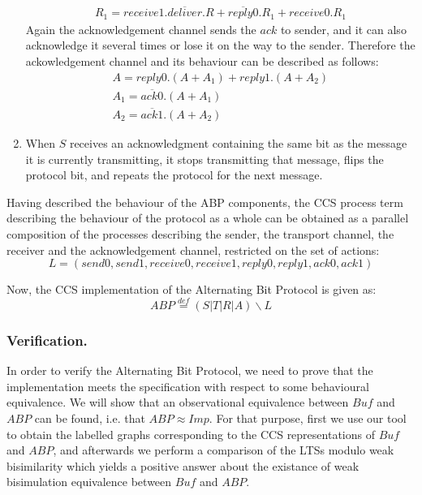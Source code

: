 \begin{enumerate}
\begin{equation*}
\begin{array}{lcl}
							R_{1}=receive1.\overline{deliver}.R+\overline{reply0}.R_{1}+receive0.R_{1}			  
						\end{array}
				\end{equation*}
        Again the acknowledgement channel sends the $ack$ to sender, and it can also acknowledge it several times or lose it on the way to the sender. Therefore the ackowledgement channel and its behaviour can be described as follows:
        \begin{equation*}\label{trans_imp}
	      	\begin{array}{lcl}
						A=reply0.\left(A+A_{1}\right)+reply1.\left(A+A_{2}\right)\\
						A_{1}=\overline{ack0}.\left(A+A_{1}\right)\\
						A_{2}=\overline{ack1}.\left(A+A_{2}\right)
					\end{array}
				\end{equation*}
  \item When $S$ receives an acknowledgment containing the same bit as the message it is currently transmitting, it stops transmitting that message, flips the protocol bit, and repeats the protocol for the next message.\cite{Kulick}\cite{ProcessAlgebraParallel}
\end{enumerate}

Having described the behaviour of the ABP components, the CCS process term describing the behaviour of the protocol as a whole can be obtained as a parallel composition of the processes describing the sender, the transport channel, the receiver and the acknowledgement channel, restricted on the set of actions:
\begin{equation*}
  L = \left(send0,send1,receive0,receive1,reply0,reply1,ack0,ack1\right)
\end{equation*}

Now, the CCS implementation of the Alternating Bit Protocol is given as:
\begin{equation}\label{abp_imp}
	ABP \stackrel{def}{=}\left(S|T|R|A\right)\backslash L
\end{equation}

\subsubsection{Verification.} In order to verify the Alternating Bit Protocol, we need to prove that the implementation meets the specification with respect to some behavioural equivalence. We will show that an observational equivalence between $Buf$ and $ABP$ can be found, i.e. that $ABP\approx Imp$. For that purpose, first we use our tool to obtain the labelled graphs corresponding to the CCS representations of $Buf$ and $ABP$, and afterwards we perform a comparison of the LTSs modulo weak bisimilarity which yields a positive answer about the existance of weak bisimulation equivalence between $Buf$ and $ABP$.

